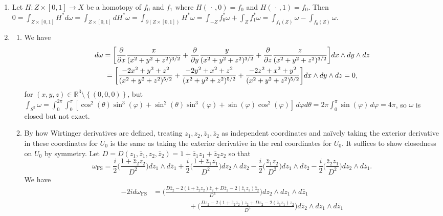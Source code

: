 \documentclass[11pt,leqno]{article}
\theoremstyle{plain}
\theoremstyle{definition}
\numberwithin{equation}{section}
\numberwithin{lem}{section}
\newcommand{\cbr}[1]{\left\{#1\right\}}
\begin{document}
\begin{enumerate}
    \item Let $H\colon Z\times [0,1]\to X$ be a homotopy of $f_0$ and $f_1$ where $H(\,\cdot\,,0) = f_0$ and $H(\,\cdot\,,1) = f_0$. Then $0 = \int_{Z\times[0,1]}H^\ast d\omega = \int_{Z\times[0,1]}dH^\ast\omega = \int_{\partial(Z\times[0,1])}H^\ast\omega = \int_{-Z}f_0^\ast\omega + \int_Zf_1^\ast\omega = \int_{f_1(Z)}\omega - \int_{f_0(Z)}\omega$.
    \item \begin{enumerate}
        \item We have 
        \begin{multline*}
            d\omega = \bigg[\pdv{x}\frac{x}{(x^2+y^2+z^2)^{3/2}} + \pdv{y}\frac{y}{(x^2+y^2+z^2)^{3/2}} + \pdv{z}\frac{z}{(x^2+y^2+z^2)^{3/2}}\bigg]dx\wedge dy\wedge dz\\
            = \bigg[\frac{-2x^2+y^2+z^2}{(x^2+y^2+z^2)^{5/2}} + \frac{-2y^2+x^2+z^2}{(x^2+y^2+z^2)^{5/2}} + \frac{-2z^2+x^2+y^2}{(x^2+y^2+z^2)^{5/2}}\bigg]dx\wedge dy\wedge dz = 0, 
        \end{multline*}
        for $(x,y,z)\in\mathbb R^3\setminus\cbr{(0,0,0)}$, but $\int_{S^2}\omega = \int_0^{2\pi}\int_0^\pi [\cos^2(\theta)\sin^3(\varphi) + \sin^2(\theta)\sin^3(\varphi) + \sin(\varphi)\cos^2(\varphi)] \,d\varphi d\theta = 2\pi\int_0^\pi\sin(\varphi)\,d\varphi = 4\pi$, so $\omega$ is closed but not exact.
        \item By how Wirtinger derivatives are defined, treating $z_1,z_2,\bar z_1,\bar z_2$ as independent coordinates and na\"ively taking the exterior derivative in these coordinates for $U_0$ is the same as taking the exterior derivative in the real coordinates for $U_0$. It suffices to show closedness on $U_0$ by symmetry. 
        Let $D = D(z_1,\bar z_1, z_2,\bar z_2) = 1 + \bar z_1z_1 + \bar z_2z_2$ so that 
        \[\omega_{\mathrm{FS}} = \frac{i}{2}\bigg(\frac{1 + \bar z_2z_2}{D^2}\bigg)dz_1\wedge d\bar z_1 + \frac{i}{2}\bigg(\frac{1 + \bar z_1z_1}{D^2}\bigg)dz_2\wedge d\bar z_2 - \frac{i}{2}\bigg(\frac{\bar z_1z_2}{D^2}\bigg)dz_1\wedge d\bar z_2 - \frac{i}{2}\bigg(\frac{\bar z_2z_1}{D^2}\bigg)dz_2\wedge d\bar z_1.\]
        We have 
        \begin{align*}
            -2id\omega_{\mathrm{FS}} &= \bigg(\frac{D\bar z_2-2(1+\bar z_2z_2)\bar z_2 + D\bar z_2-2(\bar z_1z_1)\bar z_2}{D^3}\bigg)dz_2\wedge dz_1\wedge d\bar z_1 \\
            &\hspace{5em} + \bigg(\frac{D z_2-2(1+\bar z_2z_2) z_2 + D z_2-2(\bar z_1z_1) z_2}{D^3}\bigg)d\bar z_2\wedge dz_1 \wedge d\bar z_1\\

\end{align*}
\end{enumerate}
\end{enumerate}
\end{document}
